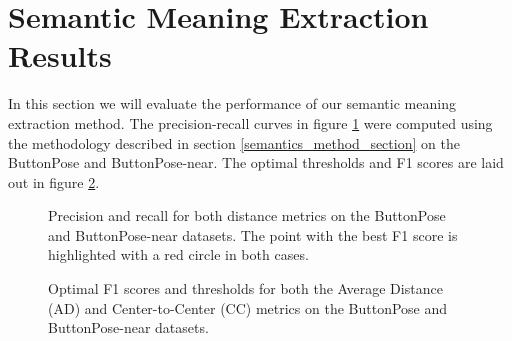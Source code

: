 \section{Semantic Meaning Extraction Results}

In this section we will evaluate the performance of our semantic meaning extraction method. The precision-recall curves in figure \ref{fig:precisionrecall} were computed using the methodology described in section \ref{semantics_method_section} on the ButtonPose and ButtonPose-near. The optimal thresholds and F1 scores are laid out in figure \ref{fig:optimal_F1}.

\begin{figure}[htp]

    
    \caption{Precision and recall for both distance metrics on the ButtonPose and ButtonPose-near datasets. The point with the best F1 score is highlighted with a red circle in both cases.}
    \label{fig:precisionrecall}
\end{figure}

\begin{figure}
    \quad
    
    \caption{Optimal F1 scores and thresholds for both the Average Distance (AD) and Center-to-Center (CC) metrics on the ButtonPose and ButtonPose-near datasets.}
    \label{fig:optimal_F1}
\end{figure}

